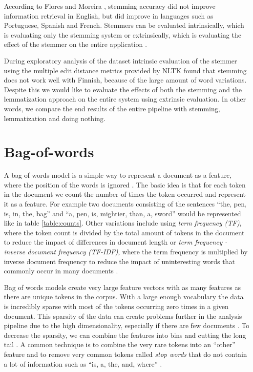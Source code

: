 \documentclass[utf8,english]{gradu3}
\begin{document}
According to Flores and Moreira \parencite*{floresAssessingImpactStemming2016}, stemming accuracy did not improve information retrieval in English, but did improve in languages such as Portuguese, Spanish and French. Stemmers can be evaluated intrinsically, which is evaluating only the stemming system or extrinsically, which is evaluating the effect of the stemmer on the entire application \parencite{floresAssessingImpactStemming2016}. 

During exploratory analysis of the dataset intrinsic evaluation of the stemmer using the multiple edit distance metrics provided by NLTK \parencite{birdNaturalLanguageProcessing2009} found that stemming does not work well with Finnish, because of the large amount of word variations. Despite this we would like to evaluate the effects of both the stemming and the lemmatization approach on the entire system using extrinsic evaluation. In other words, we compare the end results of the entire pipeline with stemming, lemmatization and doing nothing.

\section{Bag-of-words}
A bag-of-words model is a simple way to represent a document as a feature, where the position of the words is ignored \parencite{jurafskySpeechLanguageProcessing2019}. The basic idea is that for each token in the document we count the number of times the token occurred and represent it as a feature. For example two documents consisting of the sentences \enquote{the, pen, is, in, the, bag} and \enquote{a, pen, is, mightier, than, a, sword} would be represented like in table \ref{table:counts}. Other variations include using \emph{term frequency (TF)}, where the token count is divided by the total amount of tokens in the document to reduce the impact of differences in document length or \emph{term frequency - inverse document frequency (TF-IDF)}, where the term frequency is multiplied by inverse document frequency to reduce the impact of uninteresting words that commonly occur in many documents \parencite{leskovec2020mining}.

Bag of words models create very large feature vectors with as many features as there are unique tokens in the corpus. With a large enough vocabulary the data is incredibly sparse with most of the tokens occurring zero times in a given document. This sparsity of the data can create problems further in the analysis pipeline due to the high dimensionality, especially if there are few documents \parencite{verleysenCurseDimensionalityData2005}. To decrease the sparsity, we can combine the features into bins and cutting the long tail \parencite{leskovec2020mining,jurafskySpeechLanguageProcessing2019}. A common technique is to combine the very rare tokens into an \enquote{other} feature and to remove very common tokens called \emph{stop words} that do not contain a lot of information such as \enquote{is, a, the, and, where} \parencite{jurafskySpeechLanguageProcessing2019}.
\end{document}
